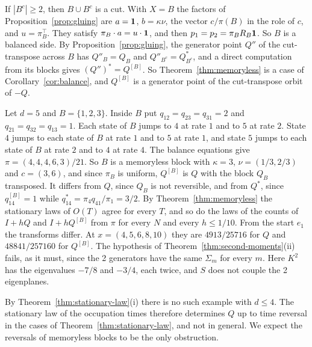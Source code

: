 \begin{remark}\label{rem:memoryless-cut}
If $|B^c|\ge2$, then $B\cup B^c$ is a cut. With $X=B$ the factors of
Proposition~\ref{prop:gluing} are $a=\mathbf{1}$, $b=\kappa\nu$, the vector $c/\pi(B)$ in the role of
$c$, and $u=\pi_B^\top$. They satisfy $\pi_B\cdot a=u\cdot\mathbf{1}$, and then
$p_1=p_2=\pi_BR_B\mathbf{1}$. So $B$ is a balanced side. By Proposition~\ref{prop:gluing}, the
generator point $Q''$ of the cut-transpose across $B$ has $Q''_B=Q_B$ and $Q''_{B^c}=Q^*_{B^c}$,
and a direct computation from its blocks gives $(Q'')^*=Q^{[B]}$. So
Theorem~\ref{thm:memoryless} is a case of Corollary~\ref{cor:balance}, and $Q^{[B]}$ is a generator
point of the cut-transpose orbit of $-Q$.
\end{remark}

\begin{example}\label{ex:five-state}
Let $d=5$ and $B=\{1,2,3\}$. Inside $B$ put $q_{12}=q_{23}=q_{31}=2$ and $q_{21}=q_{32}=q_{13}=1$.
Each state of $B$ jumps to $4$ at rate $1$ and to $5$ at rate $2$. State $4$ jumps to each state
of $B$ at rate $1$ and to $5$ at rate $1$, and state $5$ jumps to each state of $B$ at rate $2$
and to $4$ at rate $4$. The balance equations give $\pi=(4,4,4,6,3)/21$. So $B$ is a memoryless
block with $\kappa=3$, $\nu=(1/3,2/3)$ and $c=(3,6)$, and since $\pi_B$ is uniform, $Q^{[B]}$ is $Q$
with the block $Q_B$ transposed. It differs from $Q$, since $Q_B$ is not reversible, and from
$Q^*$, since $q^{[B]}_{14}=1$ while $q^*_{14}=\pi_4q_{41}/\pi_1=3/2$. By
Theorem~\ref{thm:memoryless} the stationary laws of $O(T)$ agree for every $T$, and so do the laws
of the counts of $I+hQ$ and $I+hQ^{[B]}$ from $\pi$ for every $N$ and every $h\le1/10$. From the
start $e_1$ the transforms differ. At $x=(4,5,6,8,10)$ they are $4913/25716$ for $Q$ and
$48841/257160$ for $Q^{[B]}$. The hypothesis of Theorem~\ref{thm:second-moments}(ii) fails,
as it must, since the 2 generators have the same $\Sigma_m$ for every $m$. Here $K^2$ has the
eigenvalues $-7/8$ and $-3/4$, each twice, and $S$ does not couple the 2 eigenplanes.
\end{example}

By Theorem~\ref{thm:stationary-law}(i) there is no such example with $d\le4$. The stationary law
of the occupation times therefore determines $Q$ up to time reversal in the cases of
Theorem~\ref{thm:stationary-law}, and not in general. We expect the reversals of memoryless blocks
to be the only obstruction.

